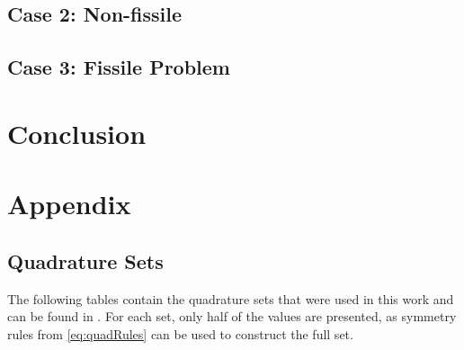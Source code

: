 \documentclass{article}
\begin{document}
\subsection{Case 2: Non-fissile} \label{sec:nonFissile}

\subsection{Case 3: Fissile Problem} \label{sec:fissile}

\section{Conclusion} 




\section{Appendix}

\subsection{Quadrature Sets} \label{sec:qsets}
The following tables contain the quadrature sets that were used in this work and can be found
in \cite{lewis1984computational}.
For each set, only half of the values are presented, as symmetry rules from \cref{eq:quadRules}
can be used to construct the full set.



\end{document}
